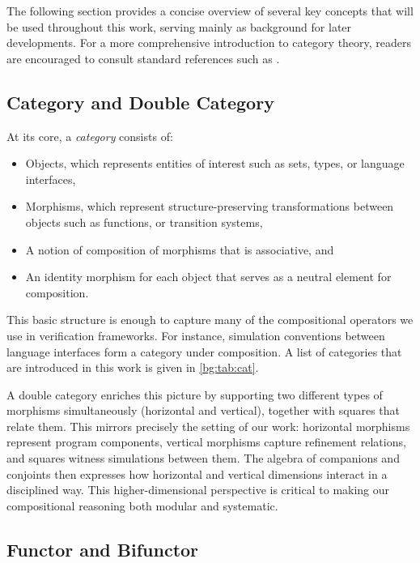 The following section provides
a concise overview of several key concepts
that will be used throughout this work,
serving mainly as background for later developments.
For a more comprehensive introduction to category theory,
readers are encouraged to consult standard references
such as \cite{awodeyct}.

\subsection{Category and Double Category}

At its core,
a \emph{category} consists of:
\begin{itemize}
  \item Objects, which represents entities of interest
    such as sets, types, or language interfaces,
  \item Morphisms, which represent structure-preserving transformations
    between objects such as functions, or transition systems,
  \item A notion of composition of morphisms that is associative, and
  \item An identity morphism for each object that serves as a neutral element for composition.
\end{itemize}

This basic structure is enough to capture
many of the compositional operators we use
in verification frameworks.
For instance,
simulation conventions between language interfaces
form a category under composition.
A list of categories
that are introduced in this work
is given in \autoref{bg:tab:cat}.

A double category enriches this picture
by supporting
two different types of morphisms simultaneously
(horizontal and vertical),
together with squares that relate them.
This mirrors precisely the setting of our work:
horizontal morphisms represent program components,
vertical morphisms capture refinement relations,
and squares witness simulations between them.
The algebra of companions and conjoints
then expresses how horizontal and vertical dimensions interact
in a disciplined way.
This higher-dimensional perspective is critical
to making our compositional reasoning
both modular and systematic.


\subsection{Functor and Bifunctor}

